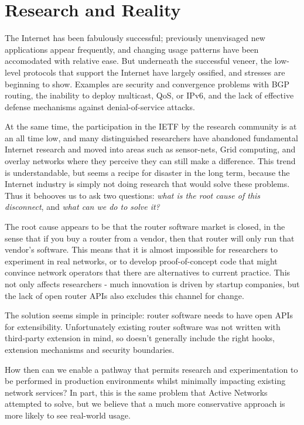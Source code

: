 
\section{Research and Reality}

The Internet has been fabulously successful; previously unenvisaged
new applications appear frequently, and changing usage patterns have
been accomodated with relative ease.  But underneath the successful
veneer, the low-level protocols that support the Internet have largely
ossified, and stresses are beginning to show.  Examples are security
and convergence problems with BGP routing, the inability to deploy
multicast, QoS, or IPv6, and the lack of effective defense mechanisms
against denial-of-service attacks.

At the same time, the participation in the IETF by the research
community is at an all time low, and many distinguished researchers
have abandoned fundamental Internet research and moved into areas such
as sensor-nets, Grid computing, and overlay networks where they
perceive they can still make a difference.  This trend is
understandable, but seems a recipe for disaster in the long term,
because the Internet industry is simply not doing research that would
solve these problems. Thus it behooves us to ask two questions: {\it
what is the root cause of this disconnect}, and {\it what can we do to
solve it?}

The root cause appears to be that the router software market is
closed, in the sense that if you buy a router from a vendor, then that
router will only run that vendor's software.  This means that it is
almost impossible for researchers to experiment in real networks, or
to develop proof-of-concept code that might convince network operators
that there are alternatives to current practice.  This not only
affects researchers - much innovation is driven by startup companies,
but the lack of open router APIs also excludes this channel for
change.

The solution seems simple in principle: router software needs to have
open APIs for extensibility.  Unfortunately existing router software
was not written with third-party extension in mind, so doesn't
generally include the right hooks, extension mechanisms and security
boundaries.  

How then can we enable a pathway that permits research and
experimentation to be performed in production environments whilst
minimally impacting existing network services?  In part, this
is the same problem that Active Networks attempted to solve, but we
believe that a much more conservative approach is more likely to see
real-world usage.

